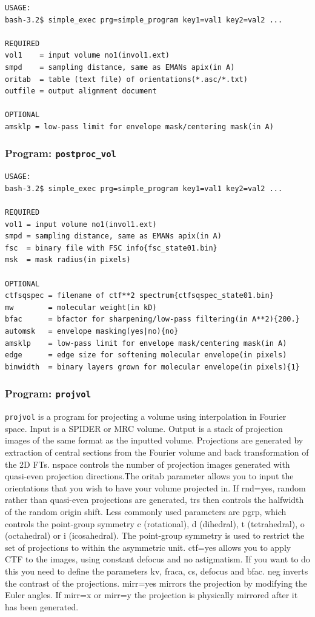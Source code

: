 \documentclass[a4paper,11pt]{article}
\newcommand{\prgname}[1]{\textcolor{NavyBlue}{\texttt{#1}}}
\begin{document}
\begin{verbatim}
USAGE:
bash-3.2$ simple_exec prg=simple_program key1=val1 key2=val2 ...

REQUIRED
vol1    = input volume no1(invol1.ext)
smpd    = sampling distance, same as EMANs apix(in A)
oritab  = table (text file) of orientations(*.asc/*.txt)
outfile = output alignment document

OPTIONAL
amsklp = low-pass limit for envelope mask/centering mask(in A)
\end{verbatim}

\subsubsection{Program: \prgname{postproc\_vol}}
\label{postproc_vol}
\begin{verbatim}
USAGE:
bash-3.2$ simple_exec prg=simple_program key1=val1 key2=val2 ...

REQUIRED
vol1 = input volume no1(invol1.ext)
smpd = sampling distance, same as EMANs apix(in A)
fsc  = binary file with FSC info{fsc_state01.bin}
msk  = mask radius(in pixels)

OPTIONAL
ctfsqspec = filename of ctf**2 spectrum{ctfsqspec_state01.bin}
mw        = molecular weight(in kD)
bfac      = bfactor for sharpening/low-pass filtering(in A**2){200.}
automsk   = envelope masking(yes|no){no}
amsklp    = low-pass limit for envelope mask/centering mask(in A)
edge      = edge size for softening molecular envelope(in pixels)
binwidth  = binary layers grown for molecular envelope(in pixels){1}
\end{verbatim}

\subsubsection{Program: \prgname{projvol}}
\label{projvol}
\prgname{projvol} is a program for projecting a volume using interpolation in Fourier space. Input is a SPIDER or MRC volume. Output is a stack of projection images of the same format as the inputted volume. Projections are generated by extraction of central sections from the Fourier volume and back transformation of the 2D FTs. nspace controls the number of projection images generated with quasi-even projection directions.The oritab parameter allows you to input the orientations that you wish to have your volume projected in. If rnd=yes, random rather than quasi-even projections are generated, trs then controls the halfwidth of the random origin shift. Less commonly used parameters are pgrp, which controls the point-group symmetry c (rotational), d (dihedral), t (tetrahedral), o (octahedral) or i (icosahedral). The point-group symmetry is used to restrict the set of projections to within the asymmetric unit. ctf=yes allows you to apply CTF to the images, using constant defocus and no astigmatism. If you want to do this you need to define the parameters kv, fraca, cs, defocus and bfac. neg inverts the contrast of the projections. mirr=yes mirrors the projection by modifying the Euler angles. If mirr=x or mirr=y the projection is physically mirrored after it has been generated.
\end{document}

